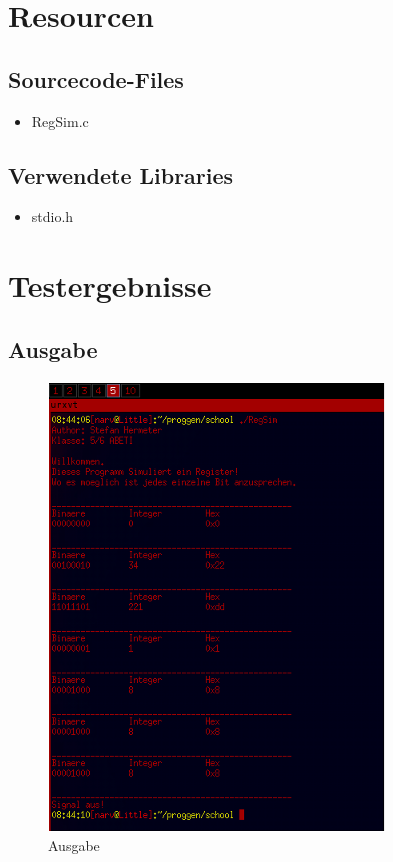 \documentclass{scrartcl}
\begin{document}
\section{Resourcen}

\subsection{Sourcecode-Files}
\begin{itemize}
\item RegSim.c
  \end{itemize}
\subsection{Verwendete Libraries}
\begin{itemize}
\item stdio.h
\end{itemize}
\section{Testergebnisse}
\subsection{Ausgabe}
\begin{figure}[H]
  \centering
  \includegraphics[width=\linewidth]{images/ausgabe1.png}
  \caption{Ausgabe}
  \label{fig:digraph}
\end{figure} 
\end{document}
